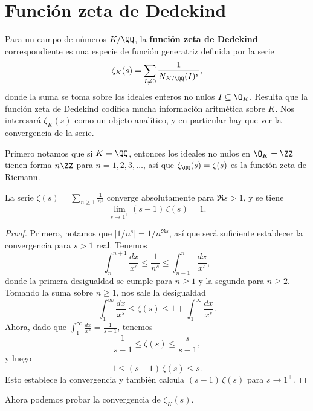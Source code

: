 \chapter{Función zeta de Dedekind}

Para un campo de números $K/\QQ$, la \textbf{función zeta de Dedekind}
correspondiente es una especie de función generatriz definida por la serie
$$\zeta_K (s) = \sum_{I \ne 0} \frac{1}{N_{K/\QQ} (I)^s},$$
donde la suma se toma sobre los ideales enteros no nulos $I \subseteq \O_K$.
Resulta que la función zeta de Dedekind codifica mucha información aritmética
sobre $K$. Nos interesará $\zeta_K (s)$ como un objeto analítico, y en
particular hay que ver la convergencia de la serie.

Primero notamos que si $K = \QQ$, entonces los ideales no nulos en $\O_K = \ZZ$
tienen forma $n\ZZ$ para $n = 1,2,3,\ldots$, así que $\zeta_\QQ (s) = \zeta (s)$
es la función zeta de Riemann.

\begin{lema}
  La serie $\zeta (s) = \sum_{n\ge 1} \frac{1}{n^s}$ converge absolutamente para
  $\Re s > 1$, y se tiene
  $$\lim_{s \to 1^+} (s - 1)\,\zeta (s) = 1.$$

  \begin{proof}
    Primero, notamos que $|1/n^s| = 1/n^{\Re s}$, así que será suficiente
    establecer la convergencia para $s > 1$ real. Tenemos
    $$\int_n^{n+1} \frac{dx}{x^s} \le \frac{1}{n^s} \le \int_{n-1}^n \frac{dx}{x^s},$$
    donde la primera desigualdad se cumple para $n \ge 1$ y la segunda para
    $n \ge 2$. Tomando la suma sobre $n \ge 1$, nos sale la desigualdad
    $$\int_1^\infty \frac{dx}{x^s} \le \zeta (s) \le 1 + \int_1^\infty \frac{dx}{x^s}.$$
    Ahora, dado que $\int_1^\infty \frac{dx}{x^s} = \frac{1}{s - 1}$, tenemos
    $$\frac{1}{s - 1} \le \zeta (s) \le \frac{s}{s - 1},$$
    y luego
    $$1 \le (s-1)\,\zeta (s) \le s.$$
    Esto establece la convergencia y también calcula $(s-1)\,\zeta (s)$ para
    $s \to 1^+$.
  \end{proof}
\end{lema}

Ahora podemos probar la convergencia de $\zeta_K (s)$.

